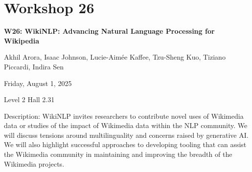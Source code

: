 \clearpage


\section[W26: WikiNLP: Advancing Natural Language Processing for Wikipedia]{Workshop 26}
\label{workshop_26}

\begin{center}
    {\Large \textbf{W26: WikiNLP: Advancing Natural Language Processing for Wikipedia}}

Akhil Arora, Isaac Johnson, Lucie-Aimée Kaffee, Tzu-Sheng Kuo, Tiziano Piccardi, Indira Sen

    Friday, August 1, 2025

Level 2 Hall 2.31
    
\end{center}

Description: WikiNLP invites researchers to contribute novel uses of Wikimedia data or studies of the impact of Wikimedia data within the NLP community. We will discuss tensions around multilinguality and concerns raised by generative AI. We will also highlight successful approaches to developing tooling that can assist the Wikimedia community in maintaining and improving the breadth of the Wikimedia projects.

